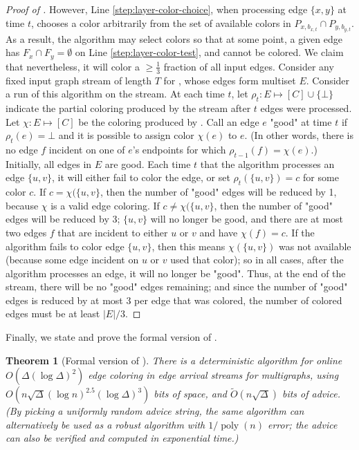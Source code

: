 \documentclass[10pt]{article}
\newtheorem{theorem}{Theorem}[section]
\theoremstyle{definition}\newtheorem{definition}[lemma]{Definition}
\theoremstyle{remark}  \newtheorem*{remark}{Remark}
\newcommand{\tO}{\widetilde{O}}
\DeclareMathOperator{\poly}{poly}
\begin{document}
\begin{proof}[Proof of ]
  However, Line \ref{step:layer-color-choice}, when processing edge $\{x,y\}$ at time $t$, chooses a color arbitrarily from the set of available colors in $P_{x,b_{x,t}} \cap P_{y,b_{y,t}}$. As a result, the algorithm may select colors so that at some point, a given edge has $F_x \cap F_y = \emptyset$ on Line \ref{step:layer-color-test}, and cannot be colored. We claim that nevertheless, it will color a $\ge \frac{1}{3}$ fraction of all input edges. Consider any fixed input graph stream of length $T$ for , whose edges form multiset $E$. Consider a run of this algorithm on the stream. At each time $t$, let $\rho_t : E \mapsto [C] \cup \{\bot\}$ indicate the partial coloring produced by the stream after $t$ edges were processed. Let $\chi : E \mapsto [C]$ be the coloring produced by  . Call an edge $e$ "good" at time $t$ if $\rho_t(e) = \bot$ and it is possible to assign color $\chi(e)$ to $e$. (In other words, there is no edge $f$ incident on one of $e$'s endpoints for which $\rho_{t-1}(f) = \chi(e)$.) Initially, all edges in $E$ are good. Each time $t$ that the algorithm processes an edge $\{u,v\}$, it will either fail to color the edge, or set $\rho_t(\{u,v\}) = c$ for some color $c$. If $c = \chi(\{u,v\}$, then the
  number of "good" edges will be reduced by 1, because $\chi$ is a valid edge
  coloring. If $c \ne \chi(\{u,v\}$, then the number of "good" edges will be reduced by 3; $\{u,v\}$ will no longer be good, and there are at most two
  edges $f$ that are incident to either $u$ or $v$ and have $\chi(f) = c$. If
  the algorithm fails to color edge $\{u,v\}$, then this means $\chi(\{u,v\})$
  was not available (because some edge incident on $u$ or $v$ used that color);
  so in all cases, after the algorithm processes an edge, it will no longer be "good". Thus, at the end of the stream, there will be no "good" edges remaining;
  and since the number of "good" edges is reduced by at most 3 per edge that was
  colored, the number of colored edges must be at least $|E|/3$.
\end{proof}

Finally, we state and prove the formal version of .

\begin{theorem}[Formal version of ]\label{thm:online-det-ea-formal}
  There is a deterministic algorithm for online $O(\Delta (\log \Delta)^2)$ edge coloring in edge arrival streams for multigraphs, using $O(n \sqrt{\Delta} (\log n)^{2.5} (\log \Delta)^3)$ bits of space, and $\tO(n \sqrt{\Delta})$ bits of advice. (By picking a uniformly random advice string, the same algorithm can alternatively be used as a robust algorithm with $1/\poly(n)$ error; the advice can also be verified and computed in exponential time.)
\end{theorem}
\end{document}
